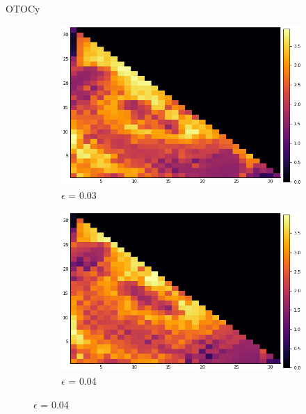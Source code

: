 \documentclass{article}
\begin{document}
\begin{section}{OTOCy}
\begin{figure}[H]
                                  \begin{subfigure}{.33\textwidth}
                                    \centering
                                    \includegraphics[width=1.0\linewidth]{HM4.png}
                                  \caption{$\epsilon$ = 0.03}
    
                                   
                                  \end{subfigure}%
                                  \begin{subfigure}{.33\textwidth}
                                    \centering
                                    \includegraphics[width=1.0\linewidth]{HM5.png}
                                  \caption{$\epsilon$ = 0.04}
    

\end{subfigure}
\end{figure}
\end{section}
\end{document}
